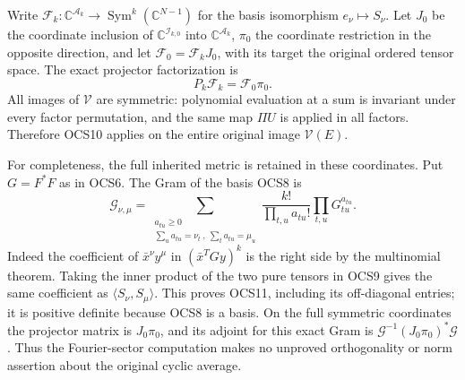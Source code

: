 \documentclass[11pt,a4paper]{article}
\begin{document}
Write $\mathcal F_k:\mathbb C^{\mathcal A_k}\to
\operatorname{Sym}^k(\mathbb C^{N-1})$ for the basis isomorphism
$e_\nu\mapsto S_\nu$. Let $J_0$ be the coordinate inclusion of
$\mathbb C^{\mathcal I_{k,0}}$ into $\mathbb C^{\mathcal A_k}$,
$\pi_0$ the coordinate restriction in the opposite direction,
and let $\mathcal F_0=\mathcal F_kJ_0$, with its target the original
ordered tensor space. The exact projector factorization is
\[
 P_k\mathcal F_k=\mathcal F_0\pi_0.
 \tag{OCS10}
\]
All images of $\mathcal V$ are symmetric: polynomial evaluation
at a sum is invariant under every factor permutation, and the
same map $\Pi U$ is applied in all factors. Therefore OCS10
applies on the entire original image $\mathcal V(E)$.

For completeness, the full inherited metric is retained in these
coordinates. Put $G=F^*F$ as in OCS6. The Gram of the basis OCS8 is
\[
 \mathcal G_{\nu,\mu}=
 \sum_{\substack{a_{tu}\geq0\\\sum_u a_{tu}=\nu_t\ ,\
                                    \sum_t a_{tu}=\mu_u}}
       \frac{k!}{\prod_{t,u}a_{tu}!}\prod_{t,u}G_{tu}^{a_{tu}}.
 \tag{OCS11}
\]
Indeed the coefficient of $\bar x^\nu y^\mu$ in
$(\bar x^TGy)^k$ is the right side by the multinomial theorem.
Taking the inner product of the two pure tensors in OCS9 gives
the same coefficient as $\langle S_\nu,S_\mu\rangle$.
This proves OCS11, including its off-diagonal entries; it is
positive definite because OCS8 is a basis. On the full symmetric
coordinates the projector matrix is $J_0\pi_0$, and its adjoint
for this exact Gram is
$\mathcal G^{-1}(J_0\pi_0)^*\mathcal G$.
Thus the Fourier-sector computation makes no unproved
orthogonality or norm assertion about the original cyclic average.
\end{document}
